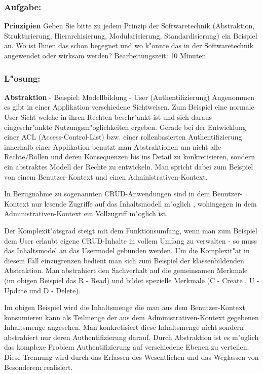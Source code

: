 \subsubsection*{Aufgabe:}

\begin{framed}
\textbf{Prinzipien}
\smallbreak
Geben Sie bitte zu jedem Prinzip der Softwaretechnik (Abstraktion, Strukturierung, Hierarchisierung, Modularisierung, Standardisierung) ein Beispiel an. Wo ist Ihnen das schon begegnet und wo k"onnte das in der Softwaretechnik angewendet oder wirksam werden?
\bigbreak
\small Bearbeitungszeit: 10 Minuten
\end{framed}
\bigbreak
\bigbreak
\subsubsection*{L"osung:}
\textbf{Abstraktion}
- Beispiel: Modellbildung - User (Authentifizierung)
\smallbreak
Angenommen es gibt in einer Applikation verschiedene Sichtweisen.
Zum Beispiel eine normale User-Sicht welche in ihren Rechten beschr"ankt ist und sich daraus eingeschr"ankte Nutzungsm"oglichkeiten ergeben.
Gerade bei der Entwicklung einer ACL (Access-Control-List) bzw. einer rollenbasierten Authentifizierung innerhalb einer Applikation benutzt man Abstraktionen um nicht alle Rechte/Rollen und deren Konsequenzen bis ins Detail zu konkretisieren, sondern ein abstraktes Modell der Rechte zu entwickeln.
Man spricht dabei zum Beispiel von einem Benutzer-Kontext und einen Administrativen-Kontext.

In Bezugnahme zu sogenannten CRUD-Anwendungen sind in dem Benutzer-Kontext nur lesende Zugriffe auf das Inhaltsmodell m"oglich , wohingegen in dem Administrativen-Kontext ein Vollzugriff m"oglich ist.

Der Komplexit"atsgrad steigt mit dem Funktionsumfang, wenn man zum Beispiel dem User erlaubt eigene CRUD-Inhalte in vollem Umfang zu verwalten - so muss das Inhaltsmodel an das Usermodel gebunden werden.
Um die Komplexit"at in diesem Fall einzugrenzen bedient man sich zum Beispiel der klassenbildenden Abstraktion. Man abstrahiert den Sachverhalt auf die gemeinsamen Merkmale (im obigen Beispiel das R - Read) und bildet spezielle Merkmale (C - Create , U - Update und D - Delete).

Im obigen Beispiel wird die Inhaltsmenge die man aus dem Benutzer-Kontext konsumieren kann als Teilmenge der aus dem Administrativen-Kontext gegebenen Inhaltsmenge angesehen.
Man konkretisiert diese Inhaltsmenge nicht sondern abstrahiert nur deren Authentifizierung darauf. Durch Abstraktion ist es m"oglich das komplexe Problem Authentifizierung auf verschiedene Ebenen zu verteilen. Diese Trennung wird durch das Erfassen des Wesentlichen und das Weglassen von Besonderem realisiert.

